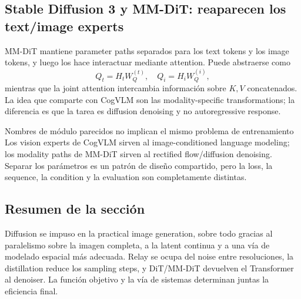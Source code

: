 
\subsection{Stable Diffusion 3 y MM-DiT: reaparecen los text/image experts}

MM-DiT mantiene parameter paths separados para los text tokens y los image tokens, y luego los hace interactuar mediante attention. Puede abstraerse como
\[
Q_t=H_tW_Q^{(t)},\quad Q_i=H_iW_Q^{(i)},
\]
mientras que la joint attention intercambia información sobre $K,V$ concatenados. La idea que comparte con CogVLM son las modality-specific transformations; la diferencia es que la tarea es diffusion denoising y no autoregressive response.


\begin{warningbox}{Nombres de módulo parecidos no implican el mismo problema de entrenamiento}
Los vision experts de CogVLM sirven al image-conditioned language modeling; los modality paths de MM-DiT sirven al rectified flow/diffusion denoising. Separar los parámetros es un patrón de diseño compartido, pero la loss, la sequence, la condition y la evaluation son completamente distintas.
\end{warningbox}

\subsection{Resumen de la sección}

Diffusion se impuso en la practical image generation, sobre todo gracias al paralelismo sobre la imagen completa, a la latent continua y a una vía de modelado espacial más adecuada. Relay se ocupa del noise entre resoluciones, la distillation reduce los sampling steps, y DiT/MM-DiT devuelven el Transformer al denoiser. La función objetivo y la vía de sistemas determinan juntas la eficiencia final.
